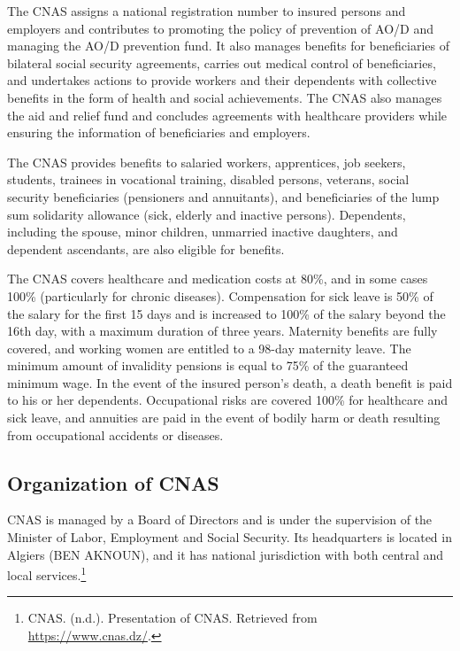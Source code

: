 The CNAS assigns a national registration number to insured persons and employers and contributes to promoting the policy of prevention of AO/D and managing the AO/D prevention fund. It also manages benefits for beneficiaries of bilateral social security agreements, carries out medical control of beneficiaries, and undertakes actions to provide workers and their dependents with collective benefits in the form of health and social achievements. The CNAS also manages the aid and relief fund and concludes agreements with healthcare providers while ensuring the information of beneficiaries and employers.

The CNAS provides benefits to salaried workers, apprentices, job seekers, students, trainees in vocational training, disabled persons, veterans, social security beneficiaries (pensioners and annuitants), and beneficiaries of the lump sum solidarity allowance (sick, elderly and inactive persons). Dependents, including the spouse, minor children, unmarried inactive daughters, and dependent ascendants, are also eligible for benefits.

The CNAS covers healthcare and medication costs at 80\%, and in some cases 100\% (particularly for chronic diseases). Compensation for sick leave is 50\% of the salary for the first 15 days and is increased to 100\% of the salary beyond the 16th day, with a maximum duration of three years. Maternity benefits are fully covered, and working women are entitled to a 98-day maternity leave. The minimum amount of invalidity pensions is equal to 75\% of the guaranteed minimum wage. In the event of the insured person's death, a death benefit is paid to his or her dependents. Occupational risks are covered 100\% for healthcare and sick leave, and annuities are paid in the event of bodily harm or death resulting from occupational accidents or diseases.
\cite{cnas-presentation}
\subsection{Organization of CNAS}
CNAS is managed by a Board of Directors and is under the supervision of the Minister of Labor, Employment and Social Security. Its headquarters is located in Algiers (BEN AKNOUN), and it has national jurisdiction with both central and local services.\footnote{CNAS. (n.d.). Presentation of CNAS. Retrieved from \url{https://www.cnas.dz/}.}

